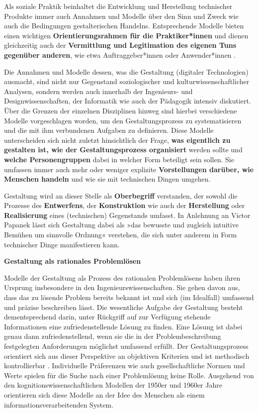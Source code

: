\documentclass[
  a4paper,
]{book}
\begin{document}
Als soziale Praktik beinhaltet die Entwicklung und Herstellung technischer Produkte immer auch Annahmen und Modelle über den Sinn und Zweck wie auch die Bedingungen gestalterischen Handelns. Entsprechende Modelle bieten einen wichtigen \textbf{Orientierungsrahmen für die Praktiker*innen} und dienen gleichzeitig auch der \textbf{Vermittlung und Legitimation des eigenen Tuns gegenüber anderen}, wie etwa Auftraggeber*innen oder Anwender*innen \citep[vgl.][]{carvalhoLegitimatingDesignSociology2009, shoveDesignEverydayLife2007}.

Die Annahmen und Modelle dessen, was die Gestaltung (digitaler Technologien) ausmacht, sind nicht nur Gegenstand soziologischer und kulturwissenschaftlicher Analysen, sondern werden auch innerhalb der Ingenieurs- und Designwissenschaften, der Informatik wie auch der Pädagogik intensiv diskutiert. Über die Grenzen der einzelnen Disziplinen hinweg sind hierbei verschiedene Modelle vorgeschlagen worden, um den Gestaltungsprozess zu systematisieren und die mit ihm verbundenen Aufgaben zu definieren. Diese Modelle unterscheiden sich nicht zuletzt hinsichtlich der Frage, \textbf{was eigentlich zu gestalten ist, wie der Gestaltungsprozess organisiert} werden sollte und \textbf{welche Personengruppen} dabei in welcher Form beteiligt sein sollen. Sie umfassen immer auch mehr oder weniger explizite \textbf{Vorstellungen darüber, wie Menschen handeln} und wie sie mit technischen Dingen umgehen.

Gestaltung wird an dieser Stelle als \textbf{Oberbegriff} verstanden, der sowohl die Prozesse des \textbf{Entwerfens}, der \textbf{Konstruktion} wie auch der \textbf{Herstellung} oder \textbf{Realisierung} eines (technischen) Gegenstands umfasst. In Anlehnung an Victor Papanek \citep{papanekDesignFurReale2009} lässt sich Gestaltung dabei als »das bewusste und zugleich intuitive Bemühen um sinnvolle Ordnung« verstehen, die sich unter anderem in Form technischer Dinge manifestieren kann.

\textbf{Gestaltung als rationales Problemlösen}

Modelle der Gestaltung als Prozess des rationalen Problemlösens haben ihren Ursprung insbesondere in den Ingenieurswissenschaften. Sie gehen davon aus, dass das zu lösende Problem bereits bekannt ist und sich (im Idealfall) umfassend und präzise beschreiben lässt. Die wesentliche Aufgabe der Gestaltung besteht dementsprechend darin, unter Rückgriff auf zur Verfügung stehende Informationen eine zufriedenstellende Lösung zu finden. Eine Lösung ist dabei genau dann zufriedenstellend, wenn sie die in der Problembeschreibung festgelegten Anforderungen möglichst umfassend erfüllt. Der Gestaltungsprozess orientiert sich aus dieser Perspektive an objektiven Kriterien und ist methodisch kontrollierbar \citep[vgl.][]{lowgrenApplyingDesignMethodology1995}. Individuelle Präferenzen wie auch gesellschaftliche Normen und Werte spielen für die Suche nach einer Problemlösung keine Rolle. Ausgehend von den kognitionswissenschaftlichen Modellen der 1950er und 1960er Jahre orientieren sich diese Modelle an der Idee des Menschen als einem informationsverarbeitenden System.
\end{document}
